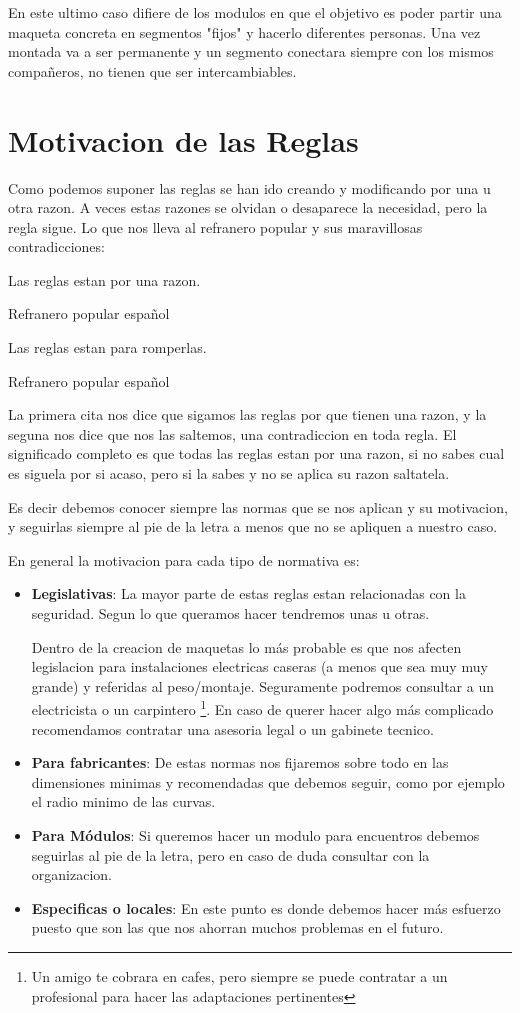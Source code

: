 En este ultimo caso difiere de los modulos en que el objetivo es poder partir una maqueta concreta en segmentos "fijos" y hacerlo diferentes personas. Una vez montada va a ser permanente y un segmento conectara siempre con los mismos compañeros, no tienen que ser intercambiables.

\section{Motivacion de las Reglas}
Como podemos suponer las reglas se han ido creando y modificando por una u otra razon. A veces estas razones se olvidan o desaparece la necesidad, pero la regla sigue. Lo que nos lleva al refranero popular y sus maravillosas contradicciones:

\epigraph{Las reglas estan por una razon.}{Refranero popular español}

\epigraph{Las reglas estan para romperlas.}{Refranero popular español}

La primera cita nos dice que sigamos las reglas por que tienen una razon, y la seguna nos dice que nos las saltemos, una contradiccion en toda regla. El significado completo es que todas las reglas estan por una razon, si no sabes cual es siguela por si acaso, pero si la sabes y no se aplica su razon saltatela.

Es decir debemos conocer siempre las normas que se nos aplican y su motivacion, y seguirlas siempre al pie de la letra a menos que no se apliquen a nuestro caso.

En general la motivacion para cada tipo de normativa es:

\begin{itemize}
	\item \textbf{Legislativas}: La mayor parte de estas reglas estan relacionadas con la seguridad. Segun lo que queramos hacer tendremos unas u otras.  

Dentro de la creacion de maquetas lo más probable es que nos afecten legislacion para instalaciones electricas caseras (a menos que sea muy muy grande) y referidas al peso/montaje. Seguramente podremos consultar a un electricista o un carpintero \footnote{Un amigo te cobrara en cafes, pero siempre se puede contratar a un profesional para hacer las adaptaciones pertinentes}. En caso de querer hacer algo más complicado recomendamos contratar una asesoria legal o un gabinete tecnico.  
	\item \textbf{Para fabricantes}: De estas normas nos fijaremos sobre todo en las dimensiones minimas y recomendadas que debemos seguir, como por ejemplo el radio minimo de las curvas.
	\item \textbf{Para Módulos}: Si queremos hacer un modulo para encuentros debemos seguirlas al pie de la letra, pero en caso de duda consultar con la organizacion.
	\item \textbf{Especificas o locales}: En este punto es donde debemos hacer más esfuerzo puesto que son las que nos ahorran muchos problemas en el futuro. 


\end{itemize}

